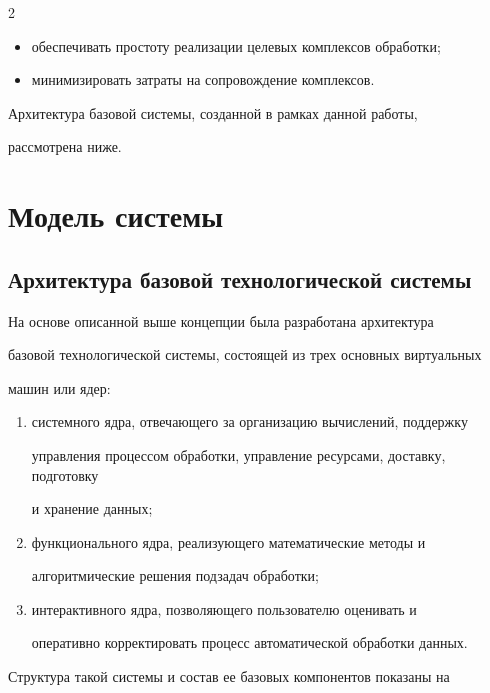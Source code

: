 \begin{multicols}{2}
\begin{itemize}
\item обеспечивать простоту реализации целевых комплексов обработки;

\item минимизировать затраты на сопровождение комплексов.

\end{itemize}



   Архитектура базовой системы, созданной в рамках данной работы, 

рассмотрена ниже.

   

\section{Модель системы}



\subsection{Архитектура базовой технологической системы}

   

   На основе описанной выше концепции была разработана архитектура 

базовой технологической системы, состоящей из трех основных виртуальных 

машин или ядер:

   \begin{enumerate}[(1)]

\item системного ядра, отвечающего за организацию вычислений, поддержку 

управления процессом обработки, управление ресурсами, доставку, подготовку 

и хранение данных;

\item функционального ядра, реализующего математические методы и 

алгоритмические решения подзадач обработки;

\item интерактивного ядра, позволяющего пользователю оценивать и 

оперативно корректировать процесс автоматической обработки данных.

   \end{enumerate}

   

   Структура такой системы и состав ее базовых компонентов показаны на 


\end{multicols}
